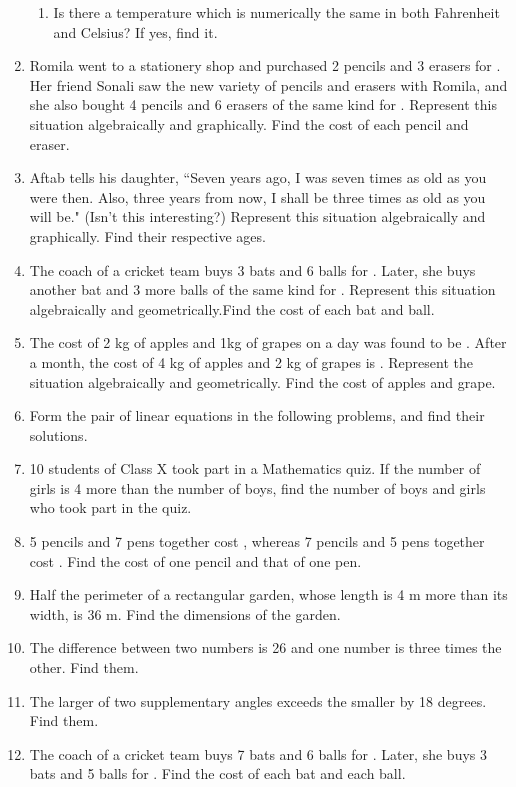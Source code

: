 \begin{enumerate}[label=\arabic*.,ref=\thesubsection.\theenumi]
\begin{enumerate}
\item Is there a temperature which is numerically the same in both Fahrenheit and Celsius? If yes, find it.
\end{enumerate}
\item Romila went to a stationery shop and purchased 2 pencils and 3 erasers for . Her friend Sonali saw the new variety of pencils and erasers with Romila, and she also bought 4 pencils and 6 erasers of the same kind for . Represent this situation algebraically and graphically. Find the cost of each pencil and eraser.
\item Aftab tells his daughter, ``Seven years ago, I was seven times as old as you were then. Also, three years from now, I shall be three times as old as you will be." (Isn’t this interesting?) Represent this situation algebraically and graphically. Find their respective ages.
\item  The coach of a cricket team buys 3 bats and 6 balls for . Later, she buys another bat and 3 more balls of the same kind for . Represent this situation algebraically and geometrically.Find the cost of each bat and ball.
\item  The cost of 2 kg of apples and 1kg of grapes on a day was found to be . After a month, the cost of 4 kg of apples and 2 kg of grapes is . Represent the situation algebraically and geometrically.  Find the cost of apples and grape.
\item Form the pair of linear equations in the following problems, and find their solutions. 
%
\item  10 students of Class X took part in a Mathematics quiz. If the number of girls is 4 more than the number of boys, find the number of boys and girls who took part in the quiz.
\item  5 pencils and 7 pens together cost , whereas 7 pencils and 5 pens together cost . Find the cost of one pencil and that of one pen.
%
\item Half the perimeter of a rectangular garden, whose length is 4 m more than its width, is 36 m. Find the dimensions of the garden.
%
\item  The difference between two numbers is 26 and one number is three times the other. Find them.
\item The larger of two supplementary angles exceeds the smaller by 18 degrees. Find them.
\item The coach of a cricket team buys 7 bats and 6 balls for . Later, she buys 3 bats and 5 balls for . Find the cost of each bat and each ball.


\end{enumerate}
